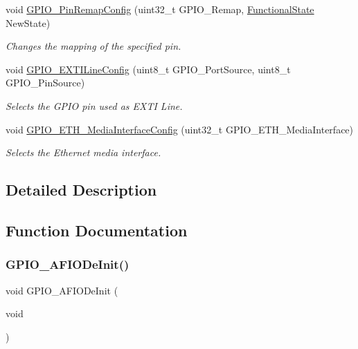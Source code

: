 \begin{DoxyCompactItemize}
void \hyperlink{group___g_p_i_o___private___functions_ga64eb76f6211b840daf9829289df4208b}{G\+P\+I\+O\+\_\+\+Pin\+Remap\+Config} (uint32\+\_\+t G\+P\+I\+O\+\_\+\+Remap, \hyperlink{group___exported__types_gac9a7e9a35d2513ec15c3b537aaa4fba1}{Functional\+State} New\+State)
\begin{DoxyCompactList}\small\item\em Changes the mapping of the specified pin. \end{DoxyCompactList}\item 
void \hyperlink{group___g_p_i_o___private___functions_ga8c1f13646d7418827378032a584da653}{G\+P\+I\+O\+\_\+\+E\+X\+T\+I\+Line\+Config} (uint8\+\_\+t G\+P\+I\+O\+\_\+\+Port\+Source, uint8\+\_\+t G\+P\+I\+O\+\_\+\+Pin\+Source)
\begin{DoxyCompactList}\small\item\em Selects the G\+P\+IO pin used as E\+X\+TI Line. \end{DoxyCompactList}\item 
void \hyperlink{group___g_p_i_o___private___functions_gacbfad958f684347be0f2c762dc85c3c2}{G\+P\+I\+O\+\_\+\+E\+T\+H\+\_\+\+Media\+Interface\+Config} (uint32\+\_\+t G\+P\+I\+O\+\_\+\+E\+T\+H\+\_\+\+Media\+Interface)
\begin{DoxyCompactList}\small\item\em Selects the Ethernet media interface. \end{DoxyCompactList}\end{DoxyCompactItemize}


\subsection{Detailed Description}


\subsection{Function Documentation}
\mbox{\label{group___g_p_i_o___private___functions_ga7f645e6b6146818c3d6c19021e70170c}} 
\subsubsection{\texorpdfstring{G\+P\+I\+O\+\_\+\+A\+F\+I\+O\+De\+Init()}{GPIO\_AFIODeInit()}}
{\footnotesize\ttfamily void G\+P\+I\+O\+\_\+\+A\+F\+I\+O\+De\+Init (\begin{DoxyParamCaption}\item[{void}]{ }\end{DoxyParamCaption})}



